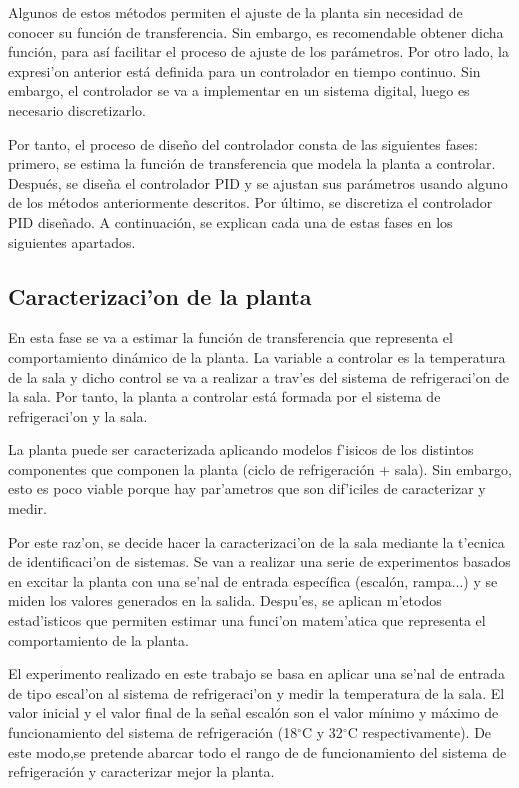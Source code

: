 	Algunos de estos métodos permiten el ajuste de la planta sin necesidad de conocer su función de transferencia. Sin embargo, es recomendable obtener dicha función, para así facilitar el proceso de ajuste de los parámetros. Por otro lado, la expresi'on anterior está definida para un controlador en tiempo continuo. Sin embargo, el controlador se va a implementar en un sistema digital, luego es necesario discretizarlo. 

	Por tanto, el proceso de diseño del controlador consta de las siguientes fases: primero, se estima la función de transferencia que modela la planta a controlar. Después, se diseña el controlador PID y se ajustan sus parámetros usando alguno de los métodos anteriormente descritos. Por último, se discretiza el controlador PID diseñado. A continuación, se explican cada una de estas fases en los siguientes apartados.

\subsection{Caracterizaci'on de la planta}\label{subsec:caract_planta}

	En esta fase se va a estimar la función de transferencia que representa el comportamiento dinámico de la planta. La variable a controlar es la temperatura de la sala y dicho control se va a realizar a trav'es del sistema de refrigeraci'on de la sala. Por tanto, la planta a controlar está formada por el sistema de refrigeraci'on y la sala. 

	La planta puede ser caracterizada aplicando modelos f'isicos de los distintos componentes que componen la planta (ciclo de refrigeración + sala). Sin embargo, esto es poco viable porque hay par'ametros que son dif'iciles de caracterizar y medir. 

	Por este raz'on, se decide hacer la caracterizaci'on de la sala mediante la t'ecnica de identificaci'on de sistemas. Se van a realizar una serie de experimentos basados en excitar la planta con una se'nal de entrada específica (escalón, rampa...) y se miden los valores generados en la salida. Despu'es, se aplican m'etodos estad'isticos que permiten estimar una funci'on matem'atica que representa el comportamiento de la planta. 

	El experimento realizado en este trabajo se basa en aplicar una se'nal de entrada de tipo escal'on al sistema de refrigeraci'on y medir la temperatura de la sala. El valor inicial y el valor final de la señal escalón son el valor mínimo y máximo de funcionamiento del sistema de refrigeración (18{$^{\circ}$}C y 32{$^{\circ}$}C respectivamente). De este modo,se pretende abarcar todo el rango de  de funcionamiento del sistema de refrigeración y caracterizar mejor la planta. 

